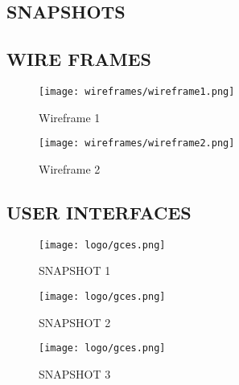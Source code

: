 \begin{center}
	\chapter{SNAPSHOTS}
\end{center}
\section{WIRE FRAMES}

\begin{figure}[h!]
	\begin{center}
		\texttt{[image: wireframes/wireframe1.png]}
	\end{center}
	\caption{Wireframe 1}
\end{figure}

\begin{figure}[h!]
	\begin{center}
		\texttt{[image: wireframes/wireframe2.png]}
	\end{center}
	\caption{Wireframe 2}
\end{figure}

\newpage
\section{USER INTERFACES}

\begin{figure}[h!]
	\begin{center}
  		\texttt{[image: logo/gces.png]}
	\end{center}
	\caption{SNAPSHOT 1}
\end{figure}

\begin{figure}[h!]
	\begin{center}
		\texttt{[image: logo/gces.png]}
	\end{center}
	\caption{SNAPSHOT 2}
\end{figure}

\begin{figure}[h!]
	\begin{center}
		\texttt{[image: logo/gces.png]}
	\end{center}
	\caption{SNAPSHOT 3}
\end{figure}